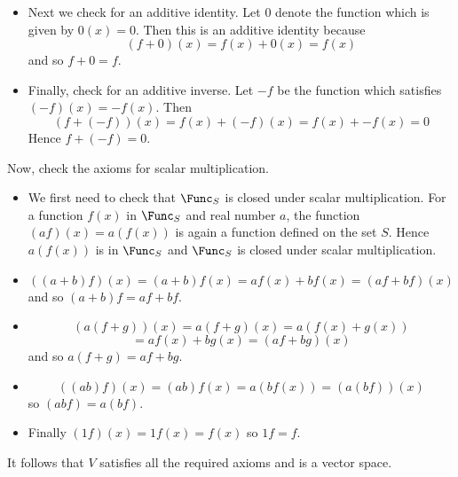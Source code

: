 \begin{solution}
\begin{itemize}
\item
Next we check for an additive identity.  Let $0$ denote the
function which is given by $0\left( x\right) =0.$ Then this is an additive
identity because 
\begin{equation*}
\left( f+0\right) \left( x\right) =f\left( x\right) +0\left( x\right)
=f\left( x\right)
\end{equation*}
and so $f+0=f$. 

\item
Finally, check for an additive inverse. Let $-f$ be the function which satisfies $\left( -f\right)
\left( x\right) = -f\left( x\right) .$ Then 
\begin{equation*}
\left( f+\left( -f\right) \right) \left( x\right) = f\left( x\right)
+\left( -f\right) \left( x\right) = f\left( x\right) +-f\left( x\right)
=0
\end{equation*}
Hence $f+\left( -f\right) =0$. 
\end{itemize}

Now, check the axioms for scalar multiplication.
\begin{itemize}
\item
We first need to check that $\Func_S$ is closed under scalar multiplication. 
For a function $f(x)$ in $\Func_S$ and real number $a$, the function $(af)(x) = a(f(x))$ is again a function defined on the set $S$. Hence $a(f(x))$ is in $\Func_S$ and $\Func_S$ is closed under scalar multiplication. 

\item
\begin{equation*}
\left( \left( a+b\right) f\right) \left( x\right) = \left( a+b\right)
f\left( x\right) =af\left( x\right) +bf\left( x\right) = \left(
af+bf\right) \left( x\right)
\end{equation*}
and so $\left( a+b\right) f=af+bf$. 

\item
\begin{equation*}
\left( a\left( f+g\right) \right) \left( x\right) = a\left( f+g\right)
\left( x\right) = a\left( f\left( x\right) +g\left( x\right) \right)
\end{equation*}
\begin{equation*}
=af\left( x\right) +bg\left( x\right) = \left( af+bg\right) \left(
x\right)
\end{equation*}
and so $a\left( f+g\right) =af+bg$. 

\item
\begin{equation*}
\left( \left( ab\right) f\right) \left( x\right) = \left( ab\right)
f\left( x\right) =a\left( bf\left( x\right) \right) = \left( a\left(
bf\right) \right) \left( x\right)
\end{equation*}
so $\left( abf\right) =a\left( bf\right) $. 

\item
Finally $\left( 1f\right) \left(
x\right) = 1f\left( x\right) =f\left( x\right) $ so $1f=f$.
\end{itemize}

It follows that $V$ satisfies all the required axioms and is a vector space.
\end{solution}

